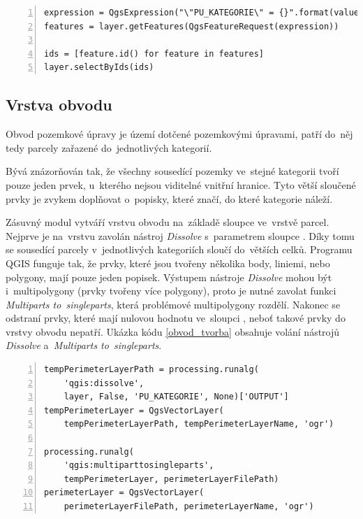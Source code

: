 {\scriptsize
\begin{lstlisting}[style=python, caption={Kategorie parcel - výběr parcel v~kategorii}, captionpos=b, label=vyber_v_kategorii, backgroundcolor = \color{light-gray},  numbers=left]
expression = QgsExpression("\"PU_KATEGORIE\" = {}".format(value))
features = layer.getFeatures(QgsFeatureRequest(expression))

ids = [feature.id() for feature in features]
layer.selectByIds(ids)
\end{lstlisting}}

\subsection{Vrstva obvodu}
\label{vrstva_obvodu}

Obvod pozemkové úpravy je území dotčené pozemkovými úpravami, patří do~něj tedy parcely zařazené do~jednotlivých kategorií.

Bývá znázorňován tak, že všechny sousedící pozemky ve~stejné kategorii tvoří pouze jeden prvek, u~kterého nejsou viditelné vnitřní hranice. Tyto větší sloučené prvky je zvykem doplňovat o~popisky, které značí, do které kategorie náleží.

Zásuvný modul vytváří vrstvu obvodu na~základě sloupce \texttt{} ve~vrstvě parcel. Nejprve je na~vrstvu \texttt{} zavolán nástroj \textit{Dissolve} s~parametrem sloupce \texttt{}. Díky tomu se sousedící parcely v~jednotlivých kategoriích sloučí do~větších celků. Programu QGIS funguje tak, že prvky, které jsou tvořeny několika body, liniemi, nebo polygony, mají pouze jeden popisek. Výstupem nástroje \textit{Dissolve} mohou být i~multipolygony (prvky tvořeny více polygony), proto je nutné zavolat funkci \textit{Multiparts to~singleparts}, která problémové multipolygony rozdělí. Nakonec se odstraní prvky, které mají nulovou hodnotu ve~sloupci \texttt{}, neboť takové prvky do vrstvy obvodu nepatří. Ukázka kódu \ref{obvod_tvorba} obsahuje volání nástrojů \textit{Dissolve} a~\textit{Multiparts to~singleparts}.

{\scriptsize
\begin{lstlisting}[style=python, caption={Vrstva obvodu - tvorba}, captionpos=b, label=obvod_tvorba, backgroundcolor = \color{light-gray},  numbers=left]
tempPerimeterLayerPath = processing.runalg(
    'qgis:dissolve',
    layer, False, 'PU_KATEGORIE', None)['OUTPUT']
tempPerimeterLayer = QgsVectorLayer(
    tempPerimeterLayerPath, tempPerimeterLayerName, 'ogr')

processing.runalg(
    'qgis:multiparttosingleparts',
    tempPerimeterLayer, perimeterLayerFilePath)
perimeterLayer = QgsVectorLayer(
    perimeterLayerFilePath, perimeterLayerName, 'ogr')
\end{lstlisting}}

